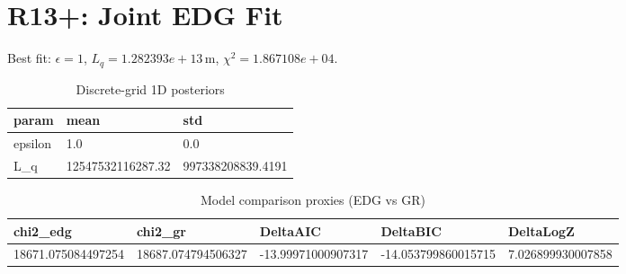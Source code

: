 \section{R13+: Joint EDG Fit}
Best fit: $\epsilon = 1$, $L_q = 1.282393e+13\,\mathrm{m}$, $\chi^2 = 1.867108e+04$.
\begin{table}[h!]
\centering
\caption{Discrete-grid 1D posteriors}
\label{tab:r13p_marg}
\begin{tabular}{l | l | l}
\hline
param & mean & std \\
\hline
epsilon & 1.0 & 0.0 \\
L_q & 12547532116287.32 & 997338208839.4191 \\
\hline
\end{tabular}
\end{table}

\begin{table}[h!]
\centering
\caption{Model comparison proxies (EDG vs GR)}
\label{tab:r13p_model}
\begin{tabular}{l | l | l | l | l}
\hline
chi2_edg & chi2_gr & DeltaAIC & DeltaBIC & DeltaLogZ \\
\hline
18671.075084497254 & 18687.074794506327 & -13.99971000907317 & -14.053799860015715 & 7.026899930007858 \\
\hline
\end{tabular}
\end{table}

